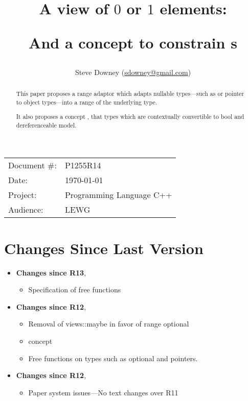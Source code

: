\documentclass[a4paper,10pt,oneside,openany,final,article]{memoir}
\begin{document}
\title{
  A view of $0$ or $1$ elements: 

  And a concept to constrain s
}
\author{
Steve Downey \small(\href{mailto:sdowney@gmail.com}{sdowney@gmail.com}) \\
}
\date{} %
\maketitle

\begin{flushright}
\begin{tabular}{ll}
  Document \#: & P1255R14 \\
  Date: & \today \\
  Project: & Programming Language C++ \\
  Audience: & LEWG
\end{tabular}
\end{flushright}

\begin{abstract}
  This paper proposes a range adaptor  which adapts nullable types---such as  or pointer to object types---into a range of the underlying type.

  It also proposes a concept , that types which are contextually convertible to bool and dereferenceable model.
\end{abstract}

\tableofcontents*

\chapter*{Changes Since Last Version}

\begin{itemize}
\item \textbf{Changes since R13},
  \begin{itemize}
  \item Specification of free functions
  \end{itemize}
\item \textbf{Changes since R12},
  \begin{itemize}
  \item Removal of views::maybe in favor of range optional
  \item {} concept
  \item Free functions on  types such as optional and pointers.
  \end{itemize}
\item \textbf{Changes since R12},
  \begin{itemize}
  \item Paper system issues---No text changes over R11
  \end{itemize}
\end{itemize}
\end{document}
